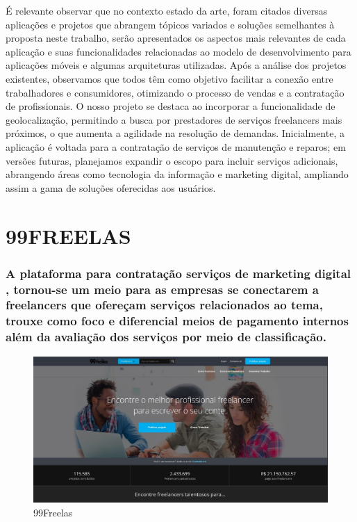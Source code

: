 É relevante observar que no contexto estado da arte, foram citados diversas aplicações e projetos que abrangem tópicos variados e soluções semelhantes à proposta neste trabalho, serão apresentados os aspectos mais relevantes de cada aplicação e suas funcionalidades relacionadas ao modelo de desenvolvimento para aplicações móveis e algumas arquiteturas utilizadas. Após a análise dos projetos existentes, observamos que todos têm como objetivo facilitar a conexão entre trabalhadores e consumidores, otimizando o processo de vendas e a contratação de profissionais. O nosso projeto se destaca ao incorporar a funcionalidade de geolocalização, permitindo a busca por prestadores de serviços freelancers mais próximos, o que aumenta a agilidade na resolução de demandas. Inicialmente, a aplicação é voltada para a contratação de serviços de manutenção e reparos; em versões futuras, planejamos expandir o escopo para incluir serviços adicionais, abrangendo áreas como tecnologia da informação e marketing digital, ampliando assim a gama de soluções oferecidas aos usuários.

\section{99FREELAS}
\subsubsection{A plataforma para contratação serviços de marketing digital \cite{99Freelas}, tornou-se um meio para as empresas se conectarem a freelancers que ofereçam serviços relacionados ao tema, trouxe como foco e diferencial meios de pagamento internos além da avaliação dos serviços por meio de classificação.}

\begin{figure}[h!]
\centering
\caption{99Freelas}
\label{fig:99Freelas}
\includegraphics[scale=0.4]{Illustrations/99Freelas.jpg}
\end{figure}


